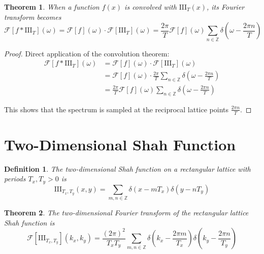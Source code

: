 \documentclass{article}
\newtheorem{theorem}{Theorem}
\newtheorem{definition}{Definition}
\begin{document}
\begin{theorem}
\label{thm:periodization_spectrum}
When a function $f(x)$ is convolved with $\text{III}_T(x)$, its Fourier transform becomes
\begin{equation}
\label{eq:periodization_spectrum}
\mathcal{F}[f * \text{III}_T](\omega) = \mathcal{F}[f](\omega) \cdot \mathcal{F}[\text{III}_T](\omega) = \frac{2\pi}{T} \mathcal{F}[f](\omega) \sum_{n \in \mathbb{Z}} \delta\left(\omega - \frac{2\pi n}{T}\right)
\end{equation}
\end{theorem}

\begin{proof}
Direct application of the convolution theorem:
\begin{align}
\mathcal{F}[f * \text{III}_T](\omega) &= \mathcal{F}[f](\omega) \cdot \mathcal{F}[\text{III}_T](\omega) \label{eq:product_theorem}\\
&= \mathcal{F}[f](\omega) \cdot \frac{2\pi}{T} \sum_{n \in \mathbb{Z}} \delta\left(\omega - \frac{2\pi n}{T}\right) \label{eq:substitute_shah_transform}\\
&= \frac{2\pi}{T} \mathcal{F}[f](\omega) \sum_{n \in \mathbb{Z}} \delta\left(\omega - \frac{2\pi n}{T}\right) \label{eq:distribute_f}
\end{align}

This shows that the spectrum is sampled at the reciprocal lattice points $\frac{2\pi n}{T}$.
\end{proof}

\section{Two-Dimensional Shah Function}

\begin{definition}
\label{def:shah_2d}
The two-dimensional Shah function on a rectangular lattice with periods $T_x, T_y > 0$ is
\begin{equation}
\label{eq:shah_2d}
\text{III}_{T_x,T_y}(x,y) = \sum_{m,n \in \mathbb{Z}} \delta(x - mT_x) \delta(y - nT_y)
\end{equation}
\end{definition}

\begin{theorem}
\label{thm:shah_2d_fourier}
The two-dimensional Fourier transform of the rectangular lattice Shah function is
\begin{equation}
\label{eq:shah_2d_fourier}
\mathcal{F}[\text{III}_{T_x,T_y}](k_x, k_y) = \frac{(2\pi)^2}{T_x T_y} \sum_{m,n \in \mathbb{Z}} \delta\left(k_x - \frac{2\pi m}{T_x}\right) \delta\left(k_y - \frac{2\pi n}{T_y}\right)
\end{equation}
\end{theorem}
\end{document}
